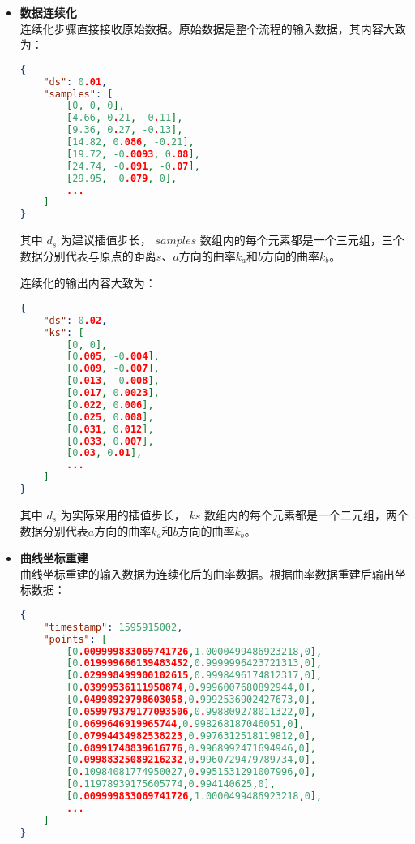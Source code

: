 \begin{itemize}

\item \textbf{数据连续化} \\
连续化步骤直接接收原始数据。原始数据是整个流程的输入数据，其内容大致为：

\begin{lstlisting}[language=json,firstnumber=1,label={lst:raw-data},caption={原始曲率数据样例}]
{
    "ds": 0.01,
    "samples": [
        [0, 0, 0],
        [4.66, 0.21, -0.11],
        [9.36, 0.27, -0.13],
        [14.82, 0.086, -0.21],
        [19.72, -0.0093, 0.08],
        [24.74, -0.091, -0.07],
        [29.95, -0.079, 0],
        ...
    ]
}
\end{lstlisting}

其中 $d_s$ 为建议插值步长，
$samples$ 数组内的每个元素都是一个三元组，三个数据分别代表与原点的距离$s$、$a$方向的曲率$k_a$和$b$方向的曲率$k_b$。

连续化的输出内容大致为：

\begin{lstlisting}[language=json,firstnumber=1,label={lst:curvature-vec},caption={插值曲率数据样例}]
{
    "ds": 0.02,
    "ks": [
        [0, 0],
        [0.005, -0.004],
        [0.009, -0.007],
        [0.013, -0.008],
        [0.017, 0.0023],
        [0.022, 0.006],
        [0.025, 0.008],
        [0.031, 0.012],
        [0.033, 0.007],
        [0.03, 0.01],
        ...
    ]
}
\end{lstlisting}

其中 $d_s$ 为实际采用的插值步长，
$ks$ 数组内的每个元素都是一个二元组，两个数据分别代表$a$方向的曲率$k_a$和$b$方向的曲率$k_b$。

\item \textbf{曲线坐标重建} \\
曲线坐标重建的输入数据为连续化后的曲率数据。根据曲率数据重建后输出坐标数据：

\begin{lstlisting}[language=json,firstnumber=1,label={lst:positions},caption={重建坐标点数据样例}]
{
    "timestamp": 1595915002,
    "points": [
        [0.009999833069741726,1.0000499486923218,0],
        [0.019999666139483452,0.9999996423721313,0],
        [0.029998499900102615,0.9998496174812317,0],
        [0.03999536111950874,0.9996007680892944,0],
        [0.04998929798603058,0.9992536902427673,0],
        [0.059979379177093506,0.998809278011322,0],
        [0.0699646919965744,0.998268187046051,0],
        [0.07994434982538223,0.9976312518119812,0],
        [0.08991748839616776,0.9968992471694946,0],
        [0.09988325089216232,0.9960729479789734,0],
        [0.10984081774950027,0.9951531291007996,0],
        [0.11978939175605774,0.994140625,0],
        [0.009999833069741726,1.0000499486923218,0],
        ...
    ]
}
\end{lstlisting}


\end{itemize}
